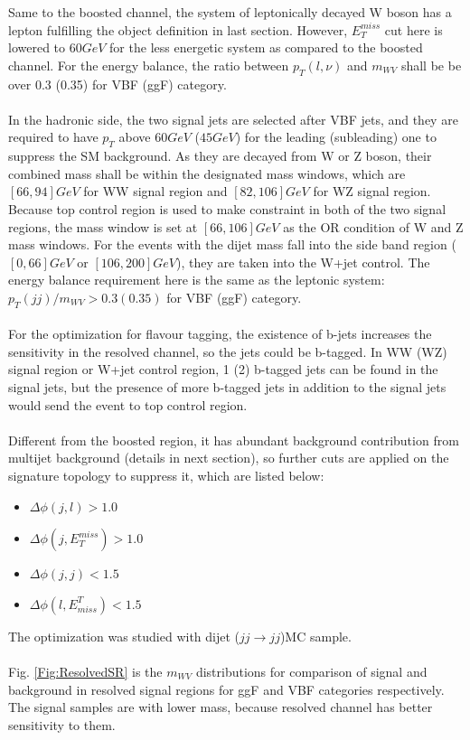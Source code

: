 Same to the boosted channel, the system of leptonically decayed W boson has a lepton fulfilling the object definition in last section. However, $E_{T}^{miss}$ cut here is lowered to $60GeV$ for the less energetic system as compared to the boosted channel. For the energy balance, the ratio between $p_{T}(l,\nu)$ and $m_{WV}$ shall be be over 0.3 (0.35) for VBF (ggF) category. 
\\
\\In the hadronic side, the two signal jets are selected after VBF jets, and they are required to have $p_{T}$ above $60GeV$ ($45GeV$) for the leading (subleading) one to suppress the SM background. As they are decayed from W or Z boson, their combined mass shall be within the designated mass windows, which are $[66, 94]GeV$ for WW signal region and $[82, 106]GeV$ for WZ signal region. Because top control region is used to make constraint in both of the two signal regions, the mass window is set at $[66,106]GeV$ as the OR condition of W and Z mass windows. For the events with the dijet mass fall into the side band region ($[0,66]GeV$ or $[106,200]GeV$), they are taken into the W+jet control. The energy balance requirement here is the same as the leptonic system: $p_{T}(jj)/m_{WV}>0.3(0.35)$ for VBF (ggF) category. 
\\
\\For the optimization for flavour tagging, the existence of b-jets increases the sensitivity in the resolved channel, so the jets could be b-tagged. In WW (WZ) signal region or W+jet control region, 1 (2) b-tagged jets can be found in the signal jets, but the presence of more b-tagged jets in addition to the signal jets would send the event to top control region.
\\
\\Different from the boosted region, it has abundant background contribution from multijet background (details in next section), so further cuts are applied on the signature topology to suppress it, which are listed below:
\begin{itemize}
	\item $\Delta\phi(j,l)>1.0$
	\item $\Delta\phi(j,E^{miss}_{T})>1.0$
	\item $\Delta\phi(j,j)<1.5$
	\item $\Delta\phi(l,E^{T}_{miss})<1.5$
\end{itemize}
The optimization was studied with dijet ($jj\rightarrow jj$)MC sample. 
\\
\\Fig. \ref{Fig:ResolvedSR} is the $m_{WV}$ distributions for comparison of signal and background in resolved signal regions for ggF and VBF categories respectively. The signal samples are with lower mass, because resolved channel has better sensitivity to them. 
